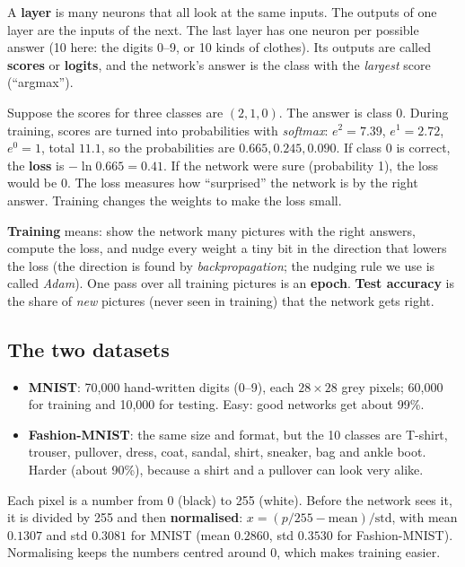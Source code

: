 A \textbf{layer} is many neurons that all look at the same inputs. The outputs of one layer are the
inputs of the next. The last layer has one neuron per possible answer (10 here: the digits 0--9, or 10
kinds of clothes). Its outputs are called \textbf{scores} or \textbf{logits}, and the network's answer is
the class with the \emph{largest} score (``argmax'').

\begin{example}
Suppose the scores for three classes are $(2,1,0)$. The answer is class 0. During training, scores are
turned into probabilities with \emph{softmax}: $e^2=7.39$, $e^1=2.72$, $e^0=1$, total $11.1$, so the
probabilities are $0.665, 0.245, 0.090$. If class 0 is correct, the \textbf{loss} is
$-\ln 0.665 = 0.41$. If the network were sure (probability 1), the loss would be 0. The loss measures how
``surprised'' the network is by the right answer. Training changes the weights to make the loss small.
\end{example}

\textbf{Training} means: show the network many pictures with the right answers, compute the loss, and
nudge every weight a tiny bit in the direction that lowers the loss (the direction is found by
\emph{backpropagation}; the nudging rule we use is called \emph{Adam}). One pass over all training
pictures is an \textbf{epoch}. \textbf{Test accuracy} is the share of \emph{new} pictures (never seen
in training) that the network gets right.

\subsection{The two datasets}

\begin{itemize}
  \item \textbf{MNIST}: 70{,}000 hand-written digits (0--9), each $28\times 28$ grey pixels; 60{,}000 for
        training and 10{,}000 for testing. Easy: good networks get about 99\%.
  \item \textbf{Fashion-MNIST}: the same size and format, but the 10 classes are T-shirt, trouser,
        pullover, dress, coat, sandal, shirt, sneaker, bag and ankle boot. Harder (about 90\%), because
        a shirt and a pullover can look very alike.
\end{itemize}

Each pixel is a number from 0 (black) to 255 (white). Before the network sees it, it is divided by 255
and then \textbf{normalised}: $x = (p/255 - \text{mean})/\text{std}$, with mean $0.1307$ and std
$0.3081$ for MNIST (mean $0.2860$, std $0.3530$ for Fashion-MNIST). Normalising keeps the numbers centred
around 0, which makes training easier.

